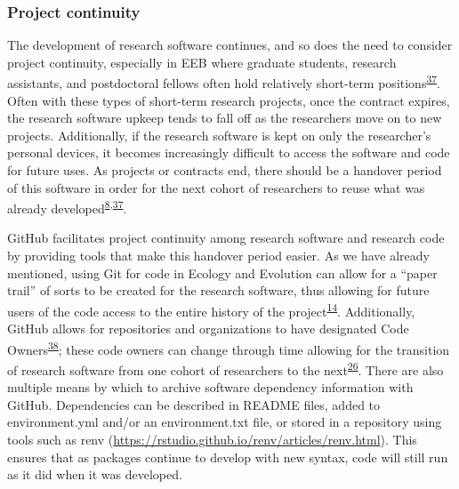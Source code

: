 \hypertarget{project-continuity}{%
\subsubsection{Project continuity}\label{project-continuity}}

The development of research software continues, and so does the need to consider project continuity, especially in EEB where graduate students, research assistants, and postdoctoral fellows often hold relatively short-term positions\textsuperscript{\protect\hyperlink{ref-D4C4k4ak}{37}}.
Often with these types of short-term research projects, once the contract expires, the research software upkeep tends to fall off as the researchers move on to new projects.
Additionally, if the research software is kept on only the researcher's personal devices, it becomes increasingly difficult to access the software and code for future uses.
As projects or contracts end, there should be a handover period of this software in order for the next cohort of researchers to reuse what was already developed\textsuperscript{\protect\hyperlink{ref-4ny1onB0}{8},\protect\hyperlink{ref-D4C4k4ak}{37}}.

GitHub facilitates project continuity among research software and research code by providing tools that make this handover period easier.
As we have already mentioned, using Git for code in Ecology and Evolution can allow for a ``paper trail'' of sorts to be created for the research software, thus allowing for future users of the code access to the entire history of the project\textsuperscript{\protect\hyperlink{ref-3DKwn1sY}{14}}.
Additionally, GitHub allows for repositories and organizations to have designated Code Owners\textsuperscript{\protect\hyperlink{ref-s91uGRZ2}{38}}; these code owners can change through time allowing for the transition of research software from one cohort of researchers to the next\textsuperscript{\protect\hyperlink{ref-iIEKCTLU}{26}}.
There are also multiple means by which to archive software dependency information with GitHub.
Dependencies can be described in README files, added to environment.yml and/or an environment.txt file, or stored in a repository using tools such as renv (\url{https://rstudio.github.io/renv/articles/renv.html}).
This ensures that as packages continue to develop with new syntax, code will still run as it did when it was developed.

